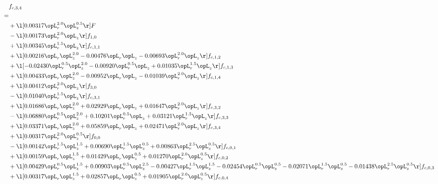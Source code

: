 \begin{alignat}{2} 
\label{eq:f_34_1} 
& f_{c,3,4} \nonumber \\ 
 = \\ 
& + \l[  0.00317 \opL_r^{2.0} \opL_z^{0.5}  \r] F \nonumber \\ 
& - \l[  0.00173 \opL_r^{2.0} \opL_z  \r] f_{1,0} \nonumber \\ 
& + \l[  0.00345 \opL_r^{1.5} \opL_z  \r] f_{c,1,1} \nonumber \\ 
& + \l[  0.00216 \opL_r \opL_z^{2.0}   -0.00476 \opL_r \opL_z   -0.00693 \opL_r^{2.0} \opL_z  \r] f_{c,1,2} \nonumber \\ 
& + \l[  -0.02430 \opL_r^{0.5} \opL_z^{2.0}   -0.00920 \opL_r^{0.5} \opL_z +  0.01035 \opL_r^{1.5} \opL_z  \r] f_{c,1,3} \nonumber \\ 
& + \l[  0.00433 \opL_r \opL_z^{2.0}   -0.00952 \opL_r \opL_z   -0.01039 \opL_r^{2.0} \opL_z  \r] f_{c,1,4} \nonumber \\ 
& + \l[  0.00412 \opL_r^{2.0} \opL_z  \r] f_{3,0} \nonumber \\ 
& - \l[  0.01040 \opL_r^{1.5} \opL_z  \r] f_{c,3,1} \nonumber \\ 
& + \l[  0.01686 \opL_r \opL_z^{2.0} +  0.02929 \opL_r \opL_z +  0.01647 \opL_r^{2.0} \opL_z  \r] f_{c,3,2} \nonumber \\ 
& - \l[  0.06880 \opL_r^{0.5} \opL_z^{2.0} +  0.10201 \opL_r^{0.5} \opL_z +  0.03121 \opL_r^{1.5} \opL_z  \r] f_{c,3,3} \nonumber \\ 
& + \l[  0.03371 \opL_r \opL_z^{2.0} +  0.05859 \opL_r \opL_z +  0.02471 \opL_r^{2.0} \opL_z  \r] f_{c,3,4} \nonumber \\ 
& + \l[  0.00317 \opL_r^{2.0} \opL_z^{0.5}  \r] f_{0,0} \nonumber \\ 
& - \l[  0.00142 \opL_r^{1.5} \opL_z^{1.5} +  0.00690 \opL_r^{1.5} \opL_z^{0.5} +  0.00863 \opL_r^{2.5} \opL_z^{0.5}  \r] f_{c,0,1} \nonumber \\ 
& + \l[  0.00159 \opL_r \opL_z^{1.5} +  0.01429 \opL_r \opL_z^{0.5} +  0.01270 \opL_r^{2.0} \opL_z^{0.5}  \r] f_{c,0,2} \nonumber \\ 
& + \l[  0.00429 \opL_r^{0.5} \opL_z^{1.5} +  0.00903 \opL_r^{0.5} \opL_z^{2.5}   -0.00427 \opL_r^{1.5} \opL_z^{1.5}   -0.02454 \opL_r^{0.5} \opL_z^{0.5}   -0.02071 \opL_r^{1.5} \opL_z^{0.5}   -0.01438 \opL_r^{2.5} \opL_z^{0.5}  \r] f_{c,0,3} \nonumber \\ 
& + \l[  0.00317 \opL_r \opL_z^{1.5} +  0.02857 \opL_r \opL_z^{0.5} +  0.01905 \opL_r^{2.0} \opL_z^{0.5}  \r] f_{c,0,4} \nonumber \\ 

\end{alignat}
